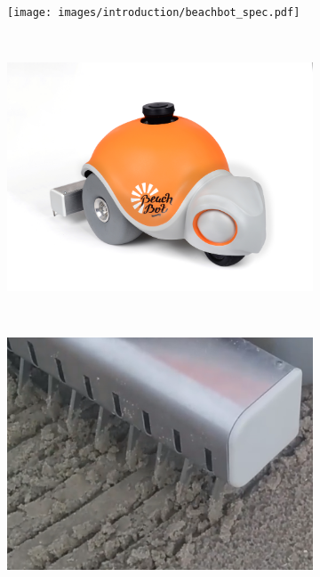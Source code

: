 \begin{figure}
\centering
\begin{subfigure}[c]{0.46\textwidth}
\texttt{[image: images/introduction/beachbot\_spec.pdf]} 
\end{subfigure}
~
\begin{subfigure}[c]{0.46\textwidth}
\includegraphics[width=\textwidth]{images/introduction/final_shell.jpg} 
\end{subfigure}
\\
\vspace{2cm}
\begin{subfigure}[c]{0.46\textwidth}
\includegraphics[width=\textwidth]{images/introduction/localization_precision.png} 
\end{subfigure}

\end{figure}
